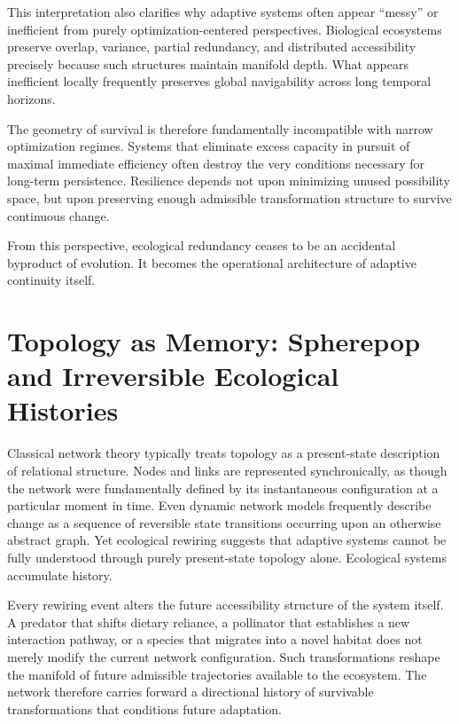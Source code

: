 \documentclass[11pt,a4paper]{article}
\begin{document}
This interpretation also clarifies why adaptive systems often appear ``messy'' or inefficient from purely optimization-centered perspectives. Biological ecosystems preserve overlap, variance, partial redundancy, and distributed accessibility precisely because such structures maintain manifold depth. What appears inefficient locally frequently preserves global navigability across long temporal horizons.

The geometry of survival is therefore fundamentally incompatible with narrow optimization regimes. Systems that eliminate excess capacity in pursuit of maximal immediate efficiency often destroy the very conditions necessary for long-term persistence. Resilience depends not upon minimizing unused possibility space, but upon preserving enough admissible transformation structure to survive continuous change.

From this perspective, ecological redundancy ceases to be an accidental byproduct of evolution. It becomes the operational architecture of adaptive continuity itself.

\newpage

\section{Topology as Memory: Spherepop and Irreversible Ecological Histories}

Classical network theory typically treats topology as a present-state description of relational structure. Nodes and links are represented synchronically, as though the network were fundamentally defined by its instantaneous configuration at a particular moment in time. Even dynamic network models frequently describe change as a sequence of reversible state transitions occurring upon an otherwise abstract graph. Yet ecological rewiring suggests that adaptive systems cannot be fully understood through purely present-state topology alone. Ecological systems accumulate history.

Every rewiring event alters the future accessibility structure of the system itself. A predator that shifts dietary reliance, a pollinator that establishes a new interaction pathway, or a species that migrates into a novel habitat does not merely modify the current network configuration. Such transformations reshape the manifold of future admissible trajectories available to the ecosystem. The network therefore carries forward a directional history of survivable transformations that conditions future adaptation.
\end{document}
